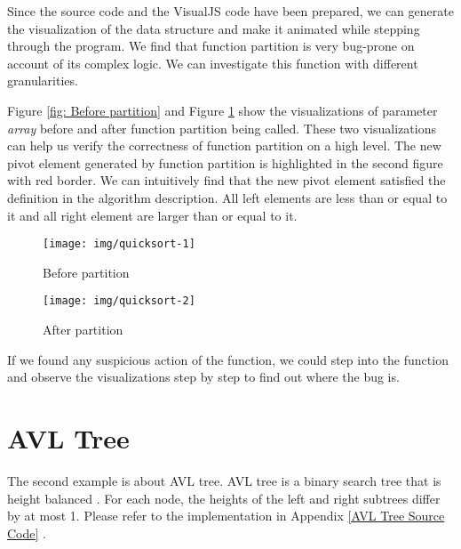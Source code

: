 Since the source code and the VisualJS code have been prepared, we can generate the visualization of the data structure and make it animated while stepping through the program. We find that function partition is very bug-prone on account of its complex logic. We can investigate this function with different granularities.

Figure \ref{fig: Before partition} and Figure \ref{fig: After partition} show the visualizations of parameter \textit{array} before and after function partition being called. These two visualizations can help us verify the correctness of function partition on a high level. The new pivot element generated by function partition is highlighted in the second figure with red border. We can intuitively find that the new pivot element satisfied the definition in the algorithm description. All left elements are less than or equal to it and all right element are larger than or equal to it.

\begin{figure}
  \begin{minipage}{0.5\hsize}
  \begin{center}
    \texttt{[image: img/quicksort-1]}
    \caption{Before partition}
    \label{fig: Before partition}
  \end{center}
  \end{minipage}
  \begin{minipage}{0.5\hsize}
  \begin{center}
    \texttt{[image: img/quicksort-2]}
    \caption{After partition}
    \label{fig: After partition}
  \end{center}
  \end{minipage}
\end{figure}

If we found any suspicious action of the function, we could step into the function and observe the visualizations step by step to find out where the bug is.

\section {AVL Tree}

The second example is about AVL tree. AVL tree is a binary search tree that is height balanced \cite{Cormen:2001:IA:580470}. For each node, the heights of the left and right subtrees differ by at most 1. Please refer to the implementation in Appendix \ref{AVL Tree Source Code} \cite{2424106}.

